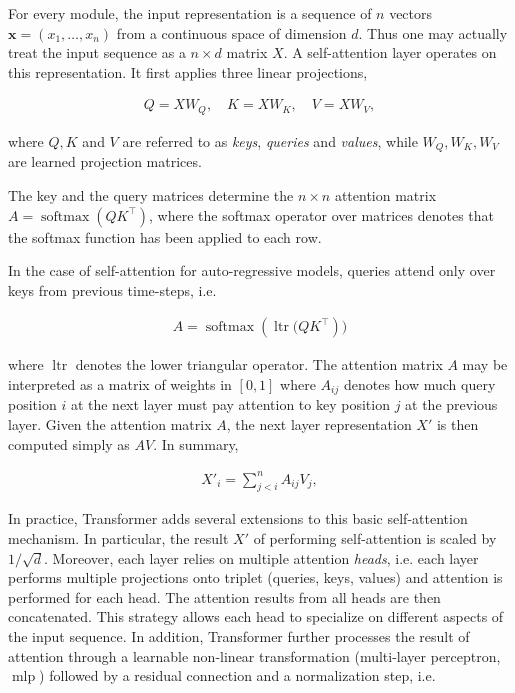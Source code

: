 For every module, the input representation is a sequence of $n$ vectors $
\mathbf{x} = (x_1, \dots, x_n) $ from a continuous space of dimension \(d\). Thus one may actually treat the input sequence as a \(n \times d\) matrix \(X\). A self-attention layer operates on this representation. It first applies three linear projections,

\begin{align}
Q = X W_Q, \quad K = X W_K, \quad V = X W_V,
\end{align}

where $Q, K$ and $V$ are referred to as \emph{keys}, \emph{queries} and \emph{values},
while $W_Q, W_K, W_V$ are learned projection matrices.

The key and the query matrices determine the \(n \times n\) attention matrix \(A = \operatorname{softmax}\left(QK^\top\right)\),
where the softmax operator over matrices denotes that the softmax function has been applied to each row. 

In the case of self-attention for auto-regressive models, queries attend only over keys from previous time-steps, i.e.

\begin{align}
A = \operatorname{softmax}\left(\operatorname{ltr}(QK^\top\right))
\end{align}

where $\operatorname{ltr}$ denotes the lower triangular operator. The attention matrix \(A\) may be interpreted as a matrix of weights in \([0, 1]\) where \(A_{ij}\) denotes how much query position \(i\) at the next layer must pay attention to key position \(j\) at the previous layer. Given the attention matrix \(A\), the next layer representation \(X'\) 
is then computed simply as \(A V\). In summary,

\begin{align}
X'_i =  \sum_{j < i}^n A_{ij}V_j,
\end{align}

In practice, Transformer \citep{vaswani2017attention} adds several extensions to this basic self-attention mechanism. In particular, the result \(X'\) of performing self-attention is scaled by
\(1/\sqrt{d}\).
Moreover, each layer relies on multiple attention \emph{heads}, i.e. each layer performs multiple projections onto triplet (queries, keys, values) and attention is performed for each head. The attention results from all heads are then concatenated. This strategy allows each head to specialize on different aspects of the input sequence. In addition, Transformer further processes the result of attention through a learnable non-linear transformation (multi-layer perceptron, $\operatorname{mlp}$) followed by a residual connection and a normalization step, i.e.


